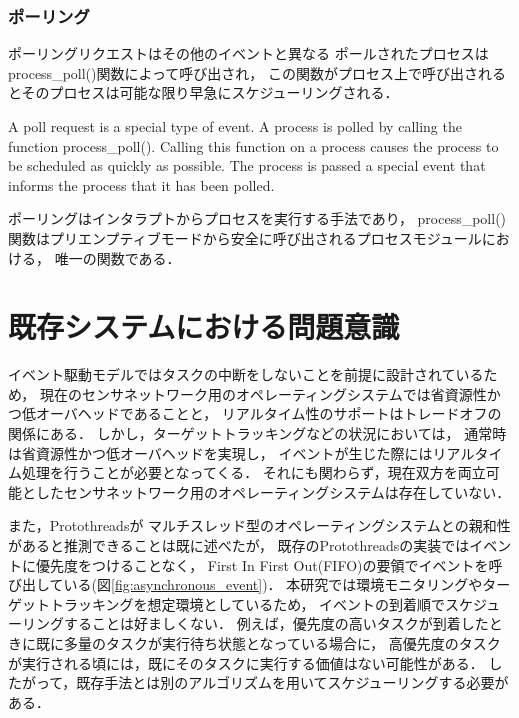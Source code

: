 \subsubsection{ポーリング}

\vspace{0.5em}ポーリングリクエストはその他のイベントと異なる
ポールされたプロセスはprocess\_poll()関数によって呼び出され，
この関数がプロセス上で呼び出されるとそのプロセスは可能な限り早急にスケジューリングされる．

A poll request is a special type of event. A process is polled by calling the function process\_poll().
Calling this function on a process causes the process to be scheduled as quickly as possible.
The process is passed a special event that informs the process that it has been polled.

ポーリングはインタラプトからプロセスを実行する手法であり，
process\_poll()関数はプリエンプティブモードから安全に呼び出されるプロセスモジュールにおける，
唯一の関数である．





\section{既存システムにおける問題意識}
イベント駆動モデルではタスクの中断をしないことを前提に設計されているため，
現在のセンサネットワーク用のオペレーティングシステムでは省資源性かつ低オーバヘッドであることと，
リアルタイム性のサポートはトレードオフの関係にある．
しかし，ターゲットトラッキングなどの状況においては，
通常時は省資源性かつ低オーバヘッドを実現し，
イベントが生じた際にはリアルタイム処理を行うことが必要となってくる．
それにも関わらず，現在双方を両立可能としたセンサネットワーク用のオペレーティングシステムは存在していない．

また，Protothreadsが
マルチスレッド型のオペレーティングシステムとの親和性があると推測できることは既に述べたが，
既存のProtothreadsの実装ではイベントに優先度をつけることなく，
First In First Out(FIFO)の要領でイベントを呼び出している(図\ref{fig:asynchronous_event})．
本研究では環境モニタリングやターゲットトラッキングを想定環境としているため，
イベントの到着順でスケジューリングすることは好ましくない．
例えば，優先度の高いタスクが到着したときに既に多量のタスクが実行待ち状態となっている場合に，
高優先度のタスクが実行される頃には，既にそのタスクに実行する価値はない可能性がある．
したがって，既存手法とは別のアルゴリズムを用いてスケジューリングする必要がある．


